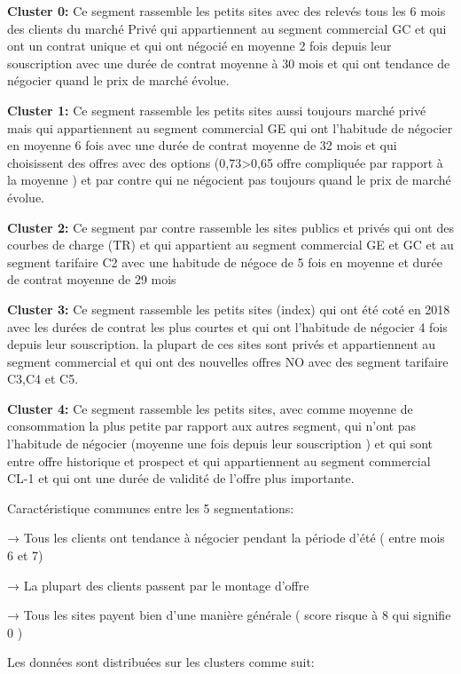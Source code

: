 \documentclass[12pt]{article}
\begin{document}
{{\bf Cluster 0:} Ce segment rassemble les petits sites avec des relevés tous les 6 mois des clients du marché Privé qui appartiennent au segment commercial GC et qui ont un contrat unique et qui ont négocié en moyenne 2 fois depuis leur souscription avec une durée de contrat moyenne à 30 mois et qui ont tendance de négocier quand le prix de marché évolue.

{\bf Cluster 1:} Ce segment rassemble les petits sites aussi toujours marché privé mais qui appartiennent au segment commercial GE qui ont l’habitude de négocier en moyenne 6 fois avec une durée de contrat moyenne de 32 mois et qui choisissent des offres avec des options (0,73>0,65 offre compliquée par rapport à la moyenne ) et par contre qui ne négocient pas toujours quand le prix de marché évolue.

{\bf Cluster 2:} Ce segment par contre rassemble les sites publics et privés qui ont des courbes de charge (TR) et qui appartient au segment commercial GE et GC et au segment tarifaire C2 avec une habitude de négoce de 5 fois en moyenne et durée de contrat moyenne de 29 mois 

{\bf Cluster 3:} Ce segment rassemble les petits sites (index) qui ont été coté en 2018 avec les durées de contrat les plus courtes et qui ont l’habitude de négocier 4 fois depuis leur souscription. la plupart de ces sites sont privés et appartiennent au segment commercial et qui ont des nouvelles offres NO avec des segment tarifaire C3,C4 et C5.

{\bf Cluster 4:} Ce segment rassemble les petits sites, avec comme moyenne de consommation la plus petite par rapport aux autres segment, qui n’ont pas l’habitude de négocier (moyenne une fois depuis leur souscription ) et qui sont entre offre historique et prospect et qui appartiennent au segment commercial CL-1 et qui ont une durée de validité de l'offre plus importante.

Caractéristique communes entre les 5 segmentations:

→ Tous les clients ont tendance à négocier pendant la période d’été ( entre mois 6 et 7) 

→ La plupart des clients passent par le montage d’offre

→ Tous les sites payent bien d’une manière générale ( score risque à 8 qui signifie 0 )

Les données sont distribuées sur les clusters comme suit:


\begin{center}
\begin{tabular}{|p{3cm}|p{3cm}|p{3cm}|}
\hline
 

\end{tabular}
\end{center}}
\end{document}
